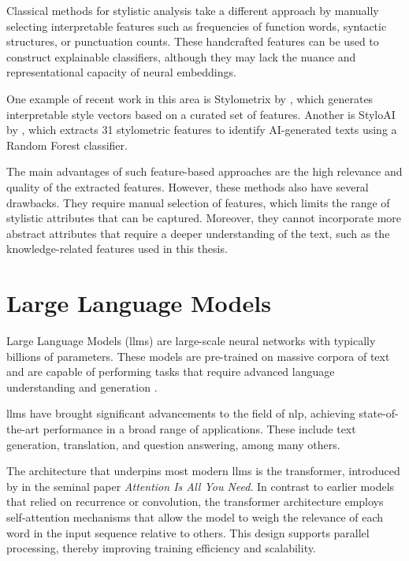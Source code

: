 Classical methods for stylistic analysis take a different approach by manually selecting interpretable features such as frequencies of function words, syntactic structures, or punctuation counts. %
These handcrafted features can be used to construct explainable classifiers, although they may lack the nuance and representational capacity of neural embeddings.

One example of recent work in this area is Stylometrix by \citet{okulskaStyloMetrixOpensourceMultilingual2023}, which generates interpretable style vectors based on a curated set of features. Another is StyloAI by \citet{oparaStyloAIDistinguishingAIgenerated2024a}, which extracts \num{31} stylometric features to identify AI-generated texts using a Random Forest classifier.

The main advantages of such feature-based approaches are the high relevance and quality of the extracted features. However, these methods also have several drawbacks. They require manual selection of features, which limits the range of stylistic attributes that can be captured. Moreover, they cannot incorporate more abstract attributes that require a deeper understanding of the text, such as the knowledge-related features used in this thesis.

\section{Large Language Models}
\label{sec:background:llm}

Large Language Models (\acfp{llm}) are large-scale neural networks with typically billions of parameters. These models are pre-trained on massive corpora of text and are capable of performing tasks that require advanced language understanding and generation \cite{minaeeLargeLanguageModels2025}.

\acp{llm} have brought significant advancements to the field of \ac{nlp}, achieving state-of-the-art performance in a broad range of applications. These include text generation, translation, and question answering, among many others.

The architecture that underpins most modern \acp{llm} is the transformer, introduced by \citet{NIPS2017_3f5ee243} in the seminal paper \textit{Attention Is All You Need}. In contrast to earlier models that relied on recurrence or convolution, the transformer architecture employs self-attention mechanisms that allow the model to weigh the relevance of each word in the input sequence relative to others. This design supports parallel processing, thereby improving training efficiency and scalability.


